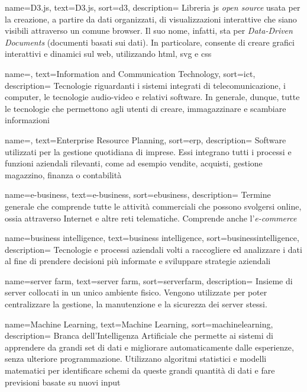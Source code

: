  {
    name=D3.js,
    text=D3.js,
    sort=d3,
    description=
    {Libreria \gls{js} \emph{open source} usata per la creazione, a partire da dati organizzati, di visualizzazioni interattive che siano visibili attraverso un comune browser.
    Il suo nome, infatti, sta per \emph{Data-Driven Documents} (documenti basati sui dati). 
    In particolare, consente di creare grafici interattivi e dinamici sul web, utilizzando \gls{html}, \gls{svg} e \gls{css}}
}

 {
    name=,
    text=Information and Communication Technology,
    sort=ict,
    description=
    {Tecnologie riguardanti i sistemi integrati di telecomunicazione, i computer, le tecnologie audio-video e relativi software.
    In generale, dunque, tutte le tecnologie che permettono agli utenti di creare, immagazzinare e scambiare informazioni}
}

 {
    name=,
    text=Enterprise Resource Planning,
    sort=erp,
    description=
    {Software utilizzati per la gestione quotidiana di imprese.
    Essi integrano tutti i processi e funzioni aziendali rilevanti, come ad esempio vendite, acquisti, gestione magazzino, finanza o contabilità}
}

 {
    name=e-business,
    text=e-business,
    sort=ebusiness,
    description=
    {Termine generale che comprende tutte le attività commerciali che possono svolgersi online, ossia attraverso 
    Internet e altre reti telematiche. Comprende anche l'\emph{e-commerce}}
}

 {
    name=business intelligence,
    text=business intelligence,
    sort=businessintelligence,
    description=
    {Tecnologie e processi aziendali volti a raccogliere ed analizzare i dati al fine di prendere decisioni più informate e 
    sviluppare strategie aziendali}
}

 {
    name=server farm,
    text=server farm,
    sort=serverfarm,
    description=
    {Insieme di server collocati in un unico ambiente fisico.
    Vengono utilizzate per poter centralizzare la gestione, la manutenzione e la sicurezza dei server stessi.}
}

 {
    name=Machine Learning,
    text=Machine Learning,
    sort=machinelearning,
    description=
    {Branca dell'Intelligenza Artificiale che permette ai sistemi
    di apprendere da grandi set di dati e migliorare automaticamente dalle esperienze, senza ulteriore programmazione. 
    Utilizzano algoritmi statistici e modelli matematici per identificare schemi da queste grandi quantità di dati e fare
    previsioni basate su nuovi input}
}

